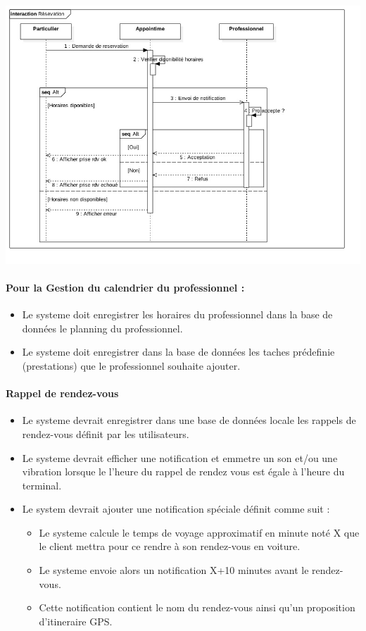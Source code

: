 \documentclass{article}
\begin{document}
\includegraphics[scale=0.5]{ShematDiagrammes/sequenceReservation.jpg}





\paragraph{Pour la Gestion du calendrier du professionnel :}
\begin{itemize}
\item Le systeme doit enregistrer les horaires du professionnel dans
  la base de données le planning du professionnel.
\item Le systeme doit enregistrer dans la base de données les taches
  prédefinie (prestations) que le professionnel souhaite ajouter.
\end{itemize}

\paragraph{Rappel de rendez-vous}
\begin{itemize}
\item Le systeme devrait enregistrer dans une base de données locale les
  rappels de rendez-vous définit par les utilisateurs.
\item Le systeme devrait efficher une notification et emmetre un son
  et/ou une vibration lorsque le l'heure du rappel de rendez vous est
  égale à l'heure du terminal.
\item Le system devrait ajouter une notification spéciale définit
  comme suit :
  \begin{itemize}
    \item Le systeme calcule le temps de voyage approximatif en minute
      noté X que le
      client mettra pour ce rendre à son rendez-vous en voiture.
     \item Le systeme envoie alors un notification X+10 minutes avant
       le rendez-vous.
     \item Cette notification contient le nom du rendez-vous ainsi
       qu'un proposition d'itineraire GPS.
  \end{itemize}

\end{itemize}
\end{document}

